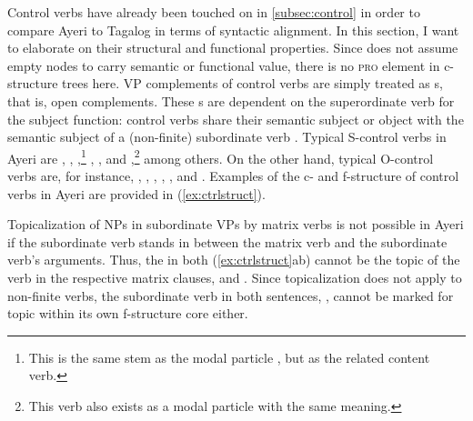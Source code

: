 Control verbs have already been touched on in \autoref{subsec:control} in order
to compare Ayeri to Tagalog in terms of syntactic alignment. In this section, I
want to elaborate on their structural and functional properties. Since \Lfg{}
does not assume empty nodes to carry semantic or functional value, there is no
\textsc{pro} element in c-structure trees here. VP complements of control verbs
are simply treated as \XCompl{}s, that is, open complements. These \XCompl{}s
are dependent on the superordinate verb for the subject function: control verbs
share their semantic subject or object with the semantic subject of a
(non-finite) subordinate verb \citep[289\psqq]{bresnan2016}.
Typical S-control verbs in Ayeri are
,
,
,\footnote{This is the same stem as the modal particle 
, but as the related content verb.}
,
, and
,\footnote{This verb also exists as a modal particle
 with the same meaning.}
among others. On the other hand, typical O-control verbs are, for instance,
,
,
,
,
, and
. Examples of the c- and f-structure of control
verbs in Ayeri are provided in (\ref{ex:ctrlstruct}).

Topicalization of NPs in subordinate VPs by matrix verbs is not possible in
Ayeri if the subordinate verb stands in between the matrix verb and the
subordinate verb's arguments. Thus, the  in both
(\ref{ex:ctrlstruct}ab) cannot be the topic of the verb in the respective
matrix clauses,  and
. Since topicalization does not apply to
non-finite verbs, the subordinate verb in both sentences,
, cannot be marked for topic within its own
f-structure core either.

